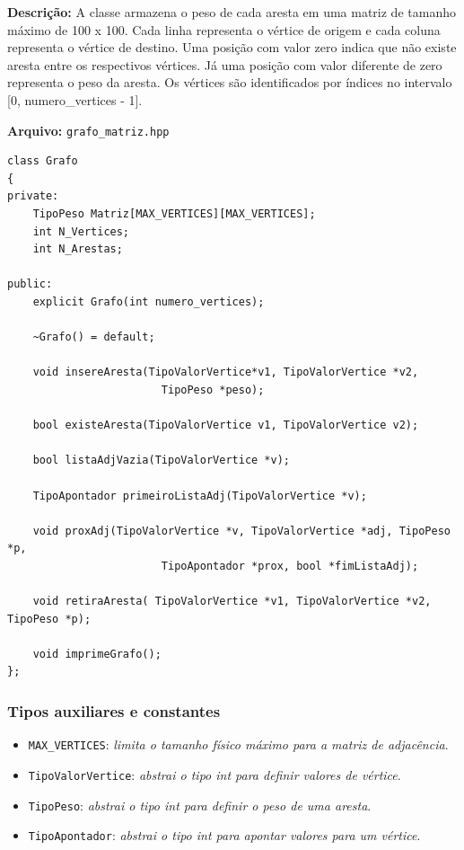 \documentclass{article}
\begin{document}
    \textbf{Descrição:} A classe armazena o peso de cada aresta em uma matriz de tamanho máximo de 100 x 100. Cada linha representa o vértice de origem e cada coluna representa o vértice de destino. Uma posição com valor zero indica que não existe aresta entre os respectivos vértices. Já uma posição com valor diferente de zero representa o peso da aresta. Os vértices são identificados por índices no intervalo [0, numero\_vertices - 1].

\textbf{Arquivo:} \texttt{grafo\_matriz.hpp}
\begin{verbatim}
class Grafo
{
private:
    TipoPeso Matriz[MAX_VERTICES][MAX_VERTICES];
    int N_Vertices;
    int N_Arestas;

public:
    explicit Grafo(int numero_vertices);

    ~Grafo() = default;

    void insereAresta(TipoValorVertice*v1, TipoValorVertice *v2,
                        TipoPeso *peso); 

    bool existeAresta(TipoValorVertice v1, TipoValorVertice v2);

    bool listaAdjVazia(TipoValorVertice *v);

    TipoApontador primeiroListaAdj(TipoValorVertice *v);
    
    void proxAdj(TipoValorVertice *v, TipoValorVertice *adj, TipoPeso *p,
                        TipoApontador *prox, bool *fimListaAdj);
    
    void retiraAresta( TipoValorVertice *v1, TipoValorVertice *v2, TipoPeso *p);

    void imprimeGrafo();
};
\end{verbatim}

\subsubsection*{Tipos auxiliares e constantes}

\begin{itemize}
    \item \texttt{MAX\_VERTICES}: \textit{limita o tamanho físico máximo para a matriz de adjacência}.
    \item \texttt{TipoValorVertice}: \textit{abstrai o tipo int para definir valores de vértice}.
    \item \texttt{TipoPeso}: \textit{abstrai o tipo int para definir o peso de uma aresta}.
    \item \texttt{TipoApontador}: \textit{abstrai o tipo int para apontar valores para um vértice}.
\end{itemize}
\end{document}
